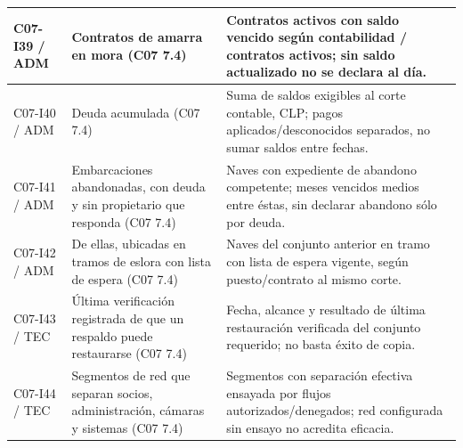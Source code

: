 \begin{longtable}{@{}L{.12\linewidth}L{.32\linewidth}L{\dimexpr.56\tabcolsep\relax}@{}}
C07-I39 / ADM & Contratos de amarra en mora (C07 7.4) & Contratos activos con saldo vencido según contabilidad /\allowbreak{} contratos activos; sin saldo actualizado no se declara al día. \\ \hline
C07-I40 / ADM & Deuda acumulada (C07 7.4) & Suma de saldos exigibles al corte contable, CLP; pagos aplicados/\allowbreak{}desconocidos separados, no sumar saldos entre fechas. \\ \hline
C07-I41 / ADM & Embarcaciones abandonadas, con deuda y sin propietario que responda (C07 7.4) & Naves con expediente de abandono competente; meses vencidos medios entre éstas, sin declarar abandono sólo por deuda. \\ \hline
C07-I42 / ADM & De ellas, ubicadas en tramos de eslora con lista de espera (C07 7.4) & Naves del conjunto anterior en tramo con lista de espera vigente, según puesto/\allowbreak{}contrato al mismo corte. \\ \hline
C07-I43 / TEC & Última verificación registrada de que un respaldo puede restaurarse (C07 7.4) & Fecha, alcance y resultado de última restauración verificada del conjunto requerido; no basta éxito de copia. \\ \hline
C07-I44 / TEC & Segmentos de red que separan socios, administración, cámaras y sistemas (C07 7.4) & Segmentos con separación efectiva ensayada por flujos autorizados/\allowbreak{}denegados; red configurada sin ensayo no acredita eficacia. \\ \hline
\end{longtable}
